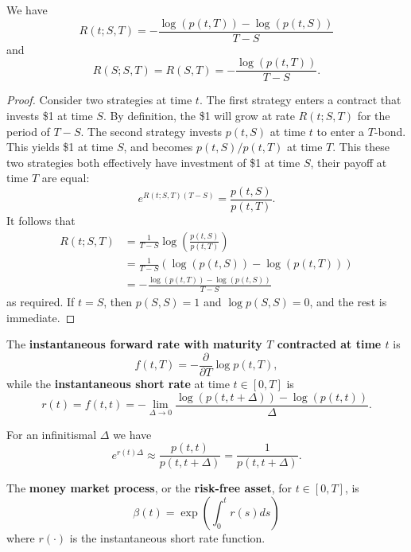 \documentclass[11pt,fleqn]{book} %
\begin{document}
\begin{proposition} \label{prop:517}
We have
\[
R(t; S, T) = -\frac{\log(p(t, T)) - \log(p(t, S))}{T - S}
\]
and
\[
R(S; S, T) = R(S, T) = -\frac{\log(p(t, T))}{T - S}.
\]
\end{proposition}
\begin{proof}
Consider two strategies at time \(t\). The first strategy enters a contract that invests \$1 at time \(S\). By definition, the \$1 will grow at rate \(R(t; S, T)\) for the period of \(T - S\). The second strategy invests \(p(t, S)\) at time \(t\) to enter a \(T\)-bond. This yields \$1 at time \(S\), and becomes \(p(t, S) / p(t, T)\) at time \(T\). This these two strategies both effectively have investment of \$1 at time \(S\), their payoff at time \(T\) are equal:
\[
e^{R(t; S, T)(T - S)} = \frac{p(t, S)}{p(t, T)}.
\]
\indent It follows that
\[
\begin{aligned}
R(t; S, T) &= \frac{1}{T - S}\log\left(\frac{p(t, S)}{p(t, T)}\right) \\
&= \frac{1}{T - S}(\log(p(t, S)) - \log(p(t, T))) \\
&= -\frac{\log(p(t, T)) - \log(p(t, S))}{T - S}
\end{aligned}
\]
as required. If \(t = S\), then \(p(S, S) = 1\) and \(\log p(S, S) = 0\), and the rest is immediate.
\end{proof}

\begin{definition} \label{def:518}
The \textbf{instantaneous forward rate with maturity \(T\) contracted at time \(t\)} is
\[
f(t, T) = -\frac{\partial}{\partial T}\log p(t, T),
\]
while the \textbf{instantaneous short rate} at time \(t \in [0, T]\) is
\[
r(t) = f(t, t) = -\lim_{\Delta\rightarrow0}\frac{\log(p(t, t + \Delta)) - \log(p(t, t))}{\Delta}.
\]
\end{definition}

\begin{remark} \label{rmk:519}
For an infinitismal \(\Delta\) we have
\[
e^{r(t)\Delta} \approx \frac{p(t, t)}{p(t, t + \Delta)} = \frac{1}{p(t, t + \Delta)}.
\]
\end{remark}

\begin{definition} \label{def:5110}
The \textbf{money market process}, or the \textbf{risk-free asset}, for \(t \in [0, T]\), is
\[
\beta(t) = \exp\left(\int_0^t r(s)ds\right)
\]
where \(r(\cdot)\) is the instantaneous short rate function.
\end{definition}
\end{document}
